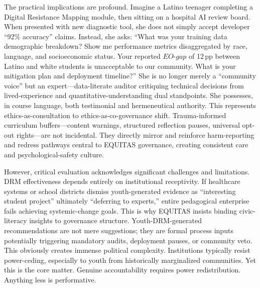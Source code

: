 \documentclass[11pt,twoside]{article}
\DeclareRobustCommand{\EOgap}{EO\text{-}gap\xspace}
\DeclareRobustCommand{\pp}{pp\xspace} %
\begin{document}
The practical implications are profound. Imagine a Latino teenager completing a Digital Resistance Mapping module, then sitting on a hospital AI review board. When presented with new diagnostic tool, she does not simply accept developer ``92\% accuracy'' claims. Instead, she asks: ``What was your training data demographic breakdown? Show me performance metrics disaggregated by race, language, and socioeconomic status. Your reported $\EOgap$ of 12\,\pp between Latino and white students is unacceptable to our community. What is your mitigation plan and deployment timeline?'' She is no longer merely a ``community voice'' but an expert---data-literate auditor critiquing technical decisions from lived-experience and quantitative-understanding dual standpoints. She possesses, in course language, both testimonial and hermeneutical authority. This represents ethics-as-consultation to ethics-as-co-governance shift. Trauma-informed curriculum buffers---content warnings, structured reflection pauses, universal opt-out rights---are not incidental. They directly mirror and reinforce harm-reporting and redress pathways central to EQUITAS governance, creating consistent care and psychological-safety culture.

However, critical evaluation acknowledges significant challenges and limitations. DRM effectiveness depends entirely on institutional receptivity. If healthcare systems or school districts dismiss youth-generated evidence as ``interesting student project'' ultimately ``deferring to experts,'' entire pedagogical enterprise fails achieving systemic-change goals. This is why EQUITAS insists binding civic-literacy insights to governance structure. Youth-DRM-generated recommendations are not mere suggestions; they are formal process inputs potentially triggering mandatory audits, deployment pauses, or community veto. This obviously creates immense political complexity. Institutions typically resist power-ceding, especially to youth from historically marginalized communities. Yet this is the core matter. Genuine accountability requires power redistribution. Anything less is performative.
\end{document}
